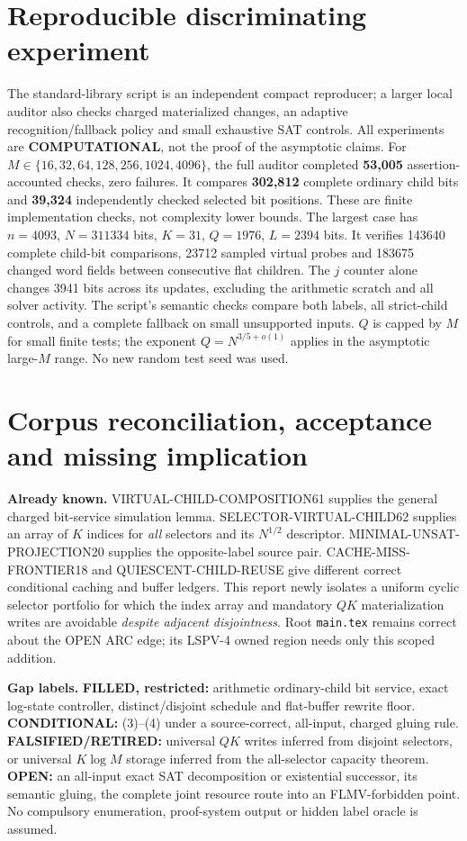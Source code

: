\documentclass[11pt]{article}
\begin{document}
\section{Reproducible discriminating experiment}
The standard-library script
is an independent compact reproducer; a larger local auditor
also checks charged materialized changes, an adaptive
recognition/fallback policy and small exhaustive SAT controls.
All experiments are \textbf{COMPUTATIONAL}, not the proof
of the asymptotic claims.
For $M\in\{16,32,64,128,256,1024,4096\}$,
the full auditor completed \textbf{53,005}
assertion-accounted checks, zero failures.
It compares \textbf{302,812} complete ordinary child bits and
\textbf{39,324} independently checked selected bit positions.
These are finite implementation checks, not complexity lower bounds.
The largest case has $n=4093$, $N=311334$ bits,
$K=31$, $Q=1976$, $L=2394$ bits.
It verifies 143640 complete child-bit comparisons,
23712 sampled virtual probes and 183675 changed word fields
between consecutive flat children. The $j$ counter alone
changes 3941 bits across its updates, excluding
the arithmetic scratch and all solver activity.
The script's semantic checks compare both labels,
all strict-child controls, and a complete fallback
on small unsupported inputs. $Q$ is capped by $M$
for small finite tests; the exponent $Q=N^{3/5+o(1)}$
applies in the asymptotic large-$M$ range.
No new random test seed was used.

\section{Corpus reconciliation, acceptance and missing implication}
\noindent\textbf{Already known.}
VIRTUAL-CHILD-COMPOSITION61 supplies the general charged
bit-service simulation lemma. SELECTOR-VIRTUAL-CHILD62
supplies an array of $K$ indices for \emph{all} selectors
and its $N^{1/2}$ descriptor. MINIMAL-UNSAT-PROJECTION20
supplies the opposite-label source pair. CACHE-MISS-FRONTIER18
and QUIESCENT-CHILD-REUSE give different correct conditional
caching and buffer ledgers. This report newly isolates a
uniform cyclic selector portfolio for which the index array
and mandatory $QK$ materialization writes are avoidable
\emph{despite adjacent disjointness}.
Root \texttt{main.tex} remains correct about the OPEN ARC edge;
its LSPV-4 owned region needs only this scoped addition.

\noindent\textbf{Gap labels.}
\textbf{FILLED, restricted:} arithmetic ordinary-child
bit service, exact log-state controller, distinct/disjoint
schedule and flat-buffer rewrite floor.
\textbf{CONDITIONAL:} (3)--(4) under a source-correct,
all-input, charged gluing rule.
\textbf{FALSIFIED/RETIRED:} universal $QK$ writes inferred
from disjoint selectors, or universal $K\log M$ storage
inferred from the all-selector capacity theorem.
\textbf{OPEN:} an all-input exact SAT decomposition or
existential successor, its semantic gluing, the complete
joint resource route into an FLMV-forbidden point.
No compulsory enumeration, proof-system output or hidden
label oracle is assumed.
\end{document}
